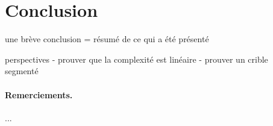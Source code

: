 \documentclass[a4paper]{easychair}
\begin{document}
\section{Conclusion}
\label{sec:conclusion}

une brève conclusion = résumé de ce qui a été présenté

perspectives
- prouver que la complexité est linéaire
- prouver un crible segmenté~\cite{crible-segmente}


\paragraph{Remerciements.} ...



\end{document}

